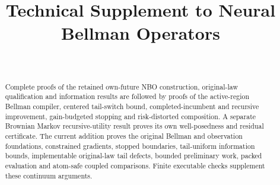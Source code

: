\documentclass[ecta,nameyear,draft]{econsocart}
\begin{document}
\begin{frontmatter}
\title{Technical Supplement to Neural Bellman Operators}
\begin{aug}
\author[id=au1,addressref={add1}]{~}
\address[id=add1]{Peking University}
\end{aug}
\begin{abstract}Complete proofs of the retained own-future NBO construction, original-law qualification and information results are followed by proofs of the active-region Bellman compiler, centered tail-switch bound, completed-incumbent and recursive improvement, gain-budgeted stopping and risk-distorted composition. A separate Brownian Markov recursive-utility result proves its own well-posedness and residual certificate. The current addition proves the original Bellman and observation foundations, constrained gradients, stopped boundaries, tail-uniform information bounds, implementable original-law tail defects, bounded preliminary work, packed evaluation and atom-safe coupled comparisons. Finite executable checks supplement these continuum arguments.\end{abstract}
\end{frontmatter}




















\end{document}
